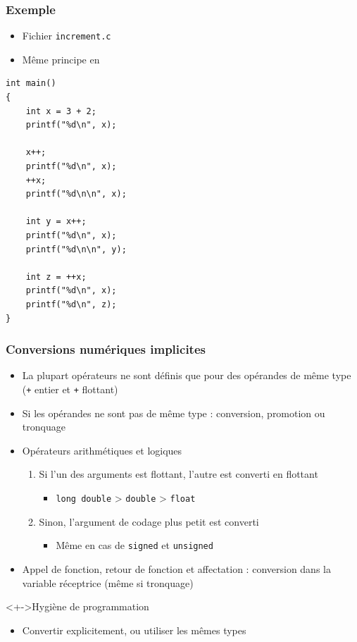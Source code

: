 \begin{frame}[containsverbatim]
\frametitle{Exemple}
\begin{itemize}
\item Fichier \texttt{increment.c}
\item Même principe en \cpp
\end{itemize}
\begin{lstlisting}
int main()
{
	int x = 3 + 2;
    printf("%d\n", x);	

	x++;
	printf("%d\n", x);
	++x;
	printf("%d\n\n", x);

	int y = x++;
	printf("%d\n", x);
	printf("%d\n\n", y);

	int z = ++x;
	printf("%d\n", x);
	printf("%d\n", z);
}

\end{lstlisting}
\end{frame}

\begin{frame}
\frametitle{Conversions numériques implicites}
\begin{itemize}[<+->]
\item La plupart opérateurs ne sont définis que pour des opérandes de même type (\texttt{+} entier et \texttt{+} flottant)
\item Si les opérandes ne sont pas de même type : conversion, promotion ou tronquage
\item Opérateurs arithmétiques et logiques
	\begin{enumerate}
	\item Si l'un des arguments est flottant, l'autre est converti en flottant
		\begin{itemize}
		\item \lstinline|long double| > \lstinline|double| > \lstinline|float|
		\end{itemize}
	\item Sinon, l'argument de codage plus petit est converti
		\begin{itemize}
		\item Même en cas de \lstinline|signed| et \lstinline|unsigned|
		\end{itemize}
	\end{enumerate}
\item Appel de fonction, retour de fonction et affectation  : conversion dans la variable réceptrice (même si tronquage)
\end{itemize}
\begin{block}<+->{Hygiène de programmation}
	\begin{itemize}[<+->]
	\item Convertir explicitement, ou utiliser les mêmes types
	\end{itemize}
\end{block}
\end{frame}

